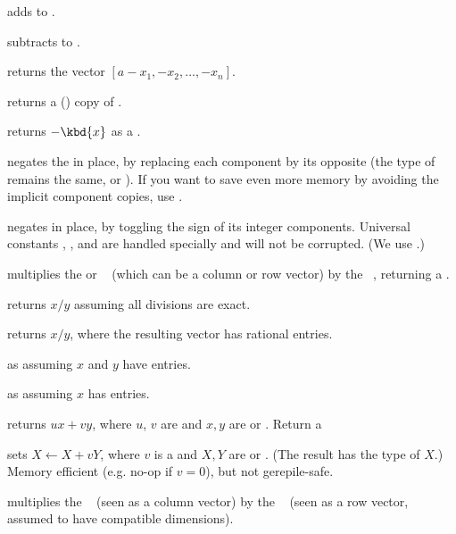  adds  to .

 subtracts  to .

 returns the vector $[a - x_1,
-x_2,\dots,-x_n]$.

 returns a () copy of .

 returns $-\kbd{x}$ as a .

 negates the   in place, by
replacing each component by its opposite (the type of  remains the
same,  or ). If you want to save even more memory by
avoiding the implicit component copies, use .

 negates  in place, by toggling the
sign of its integer components. Universal constants ,
,  and  are handled specially and will
not be corrupted. (We use .)

 multiplies the  or ~
(which can be a column or row vector) by the ~, returning a
.

 returns $x/y$ assuming all divisions
are exact.

 returns $x/y$, where the resulting vector
has rational entries.

 as  assuming $x$
and $y$ have  entries.

 as  assuming $x$
has  entries.

 returns $ux + vy$, where
$u$, $v$ are  and $x,y$ are  or . Return a 

 sets $X\leftarrow X +
vY$, where $v$ is a  and $X,Y$ are  or . (The result
has the type of $X$.) Memory efficient (e.g. no-op if $v = 0$), but not
gerepile-safe.

 multiplies the ~
(seen as a column vector) by the ~ (seen as a row vector,
assumed to have compatible dimensions).

